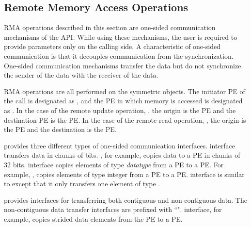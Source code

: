 \subsection{Remote Memory Access Operations}
\label{sec:rma}
\ac{RMA} operations described in this section are one-sided communication
mechanisms of the \openshmem{} \ac{API}. While using these mechanisms, the user is required to provide parameters only on the calling side. A characteristic of one-sided communication is that it decouples communication from
the synchronization. One-sided communication mechanisms transfer 
the data but do not synchronize the sender of the data with the receiver of the data. 

\openshmem{} \ac{RMA} operations are all performed on the symmetric objects. 
The initiator \ac{PE} of the call is designated as \source{}, and the 
\ac{PE} in which memory is accessed is designated as \target{}. In the case of the remote
update operation, \PUT{}, the origin is the \source{} \ac{PE} and the 
destination \ac{PE} is the \target{} PE. In the case of the remote read operation, \GET{}, 
the origin is the \target{} \ac{PE} and the destination is the \source{} \ac{PE}.

\openshmem{} provides three different types of one-sided communication interfaces. 
 interface transfers data in chunks 
of bits. , for example, copies data to a \target{} \ac{PE} in chunks of 32 bits.  interface copies elements of type 
\textit{datatype} from a \source{} \ac{PE} to a \target{} \ac{PE}. 
For example, , copies elements
of type integer from a \source{} \ac{PE} to a \target{} \ac{PE}. 
 interface is similar to  except that it only transfers one element of type .

\openshmem{} provides interfaces for transferring both contiguous and 
non-contiguous data. The non-contiguous data transfer interfaces are prefixed 
with ``".  interface, for example, copies strided data elements from the \source{} \ac{PE} to a \target{} \ac{PE}. 


